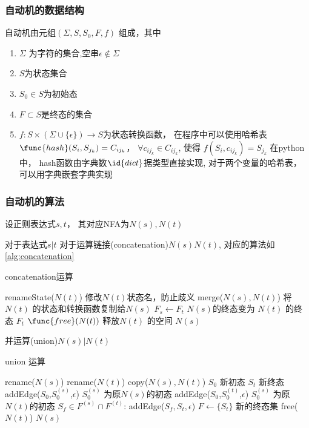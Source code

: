 \documentclass[../report.tex]{subfiles}
\begin{document}
\subsubsection{自动机的数据结构}
  自动机由元组$(\Sigma,S,S_0,F,f)$
  组成，其中
  
  \begin{enumerate}
    \item $\Sigma$ 为字符的集合,空串$\epsilon \notin \Sigma$
    \item $S$为状态集合
    \item $S_0 \in S$为初始态
    \item $F \subset S$是终态的集合
    \item $f:S \times (\Sigma \cup \{ \epsilon\}) \to S$为状态转换函数，
      在程序中可以使用哈希表
      $\func{hash}(S_i,S_{j_k}) = C_{ij_k}$，
      $\forall c_{ij_k} \in C_{ij_k}$,
      使得
      $f(S_i,c_{ij_k}) = S_{j_k}$
      在python中，
      hash函数由字典数$\id{dict}$据类型直接实现,
      对于两个变量的哈希表，
      可以用字典嵌套字典实现
  \end{enumerate}

\subsubsection{自动机的算法}
  设正则表达式$s,t$，
  其对应NFA为$N(s), N(t)$

  对于表达式$s|t$
  对于运算链接(concatenation)$N(s)N(t)$,
  对应的算法如%
  \cref{alg:concatenation}
  \begin{algorithm}[H]
    \caption{concatenation运算}
    \begin{codebox}
        \li renameState($N(t)$) \Comment 修改$N(t)$状态名，防止歧义
        \li merge($N(s),N(t)$) \Comment 将$N(t)$ 的状态和转换函数复制给$N(s)$
        \li $F_{s} \gets F_{t}$ \Comment $N(s)$的终态变为 $N(t)$ 的终态 $F_{t}$
        \li $\func{free}(N(t))$ \Comment 释放$N(t)$ 的空间
        \li \Return $N(s)$
    \end{codebox}
    \label{alg:concatenation}
  \end{algorithm}



  并运算(union)$N(s) | N(t)$
  \begin{algorithm}[H]
    \caption{union 运算}
    \begin{codebox}
        \li rename($N(s)$)
        \li rename($N(t)$)
        \li copy($N(s),N(t)$)
        \li {} $S_0$ \Comment 新初态
        \li {} $S_t$ \Comment 新终态
        \li addEdge($S_0$,$S_0^{(s)}$,$\epsilon$) \Comment $S_0^{(s)}$ 为原$N(s)$的初态
        \li addEdge($S_0$,$S_0^{(t)}$,$\epsilon$) \Comment $S_0^{(s)}$ 为原$N(t)$的初态
        \li\For $S_f \in F^{(s)} \cap F^{(t)}$:
        \Then
          \li addEdge($S_f,S_t,\epsilon$)
        \End
        \li $F \gets \{ S_t\} $  \Comment 新的终态集
        \li free($N(t)$)
        \li \Return $N(s)$
    \end{codebox}
    \label{alg:union}
  \end{algorithm}
\end{document}

